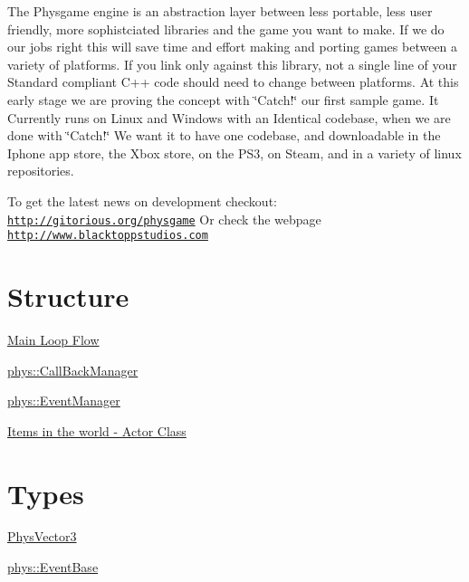 The Physgame engine is an abstraction layer between less portable, less user friendly, more sophistciated libraries and the game you want to make. If we do our jobs right this will save time and effort making and porting games between a variety of platforms. If you link only against this library, not a single line of your Standard compliant C++ code should need to change between platforms. At this early stage we are proving the concept with \char`\"{}Catch!\char`\"{} our first sample game. It Currently runs on Linux and Windows with an Identical codebase, when we are done with \char`\"{}Catch!\char`\"{} We want it to have one codebase, and downloadable in the Iphone app store, the Xbox store, on the PS3, on Steam, and in a variety of linux repositories.

To get the latest news on development checkout: \href{http://gitorious.org/physgame}{\tt http://gitorious.org/physgame} Or check the webpage \href{http://www.blacktoppstudios.com}{\tt http://www.blacktoppstudios.com}\hypertarget{index_Engine}{}\section{Structure}\label{index_Engine}
\hyperlink{mainloop1}{Main Loop Flow}

\hyperlink{classphys_1_1CallBackManager}{phys::CallBackManager}

\hyperlink{classphys_1_1EventManager}{phys::EventManager}

\hyperlink{classphys_1_1ActorBase}{Items in the world -\/ Actor Class}\hypertarget{index_Data}{}\section{Types}\label{index_Data}
\hyperlink{classPhysVector3}{PhysVector3}

\hyperlink{classphys_1_1EventBase}{phys::EventBase} 